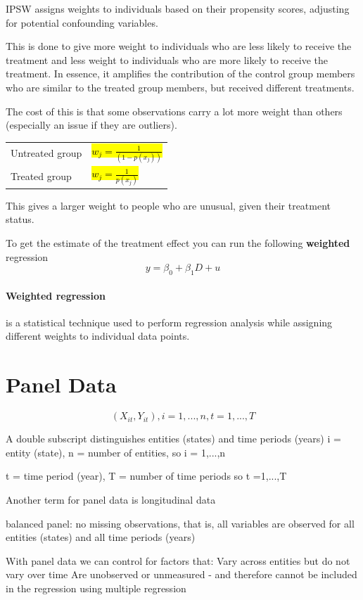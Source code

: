 \documentclass[a3paper, 8pt]{extarticle}
\begin{document}
\begin{multicols*}{5}
IPSW assigns weights to individuals based on their propensity scores, adjusting for potential confounding variables.

This is done to give more weight to individuals who are less likely to receive the treatment and less weight to individuals who are more likely to receive the treatment. In essence, it amplifies the contribution of the control group members who are similar to the treated group members, but received different treatments.

The cost of this is that some observations carry a lot more weight than others (especially an issue if they are outliers).

\begin{tabular}{l l}
    Untreated group & \hl{$w_j=\frac{1}{(1-p(x_j))}$} \\
    Treated group & \hl{$w_j=\frac{1}{p(x_j)}$}
\end{tabular}

This gives a larger weight to people who are unusual, given their treatment status.

To get the estimate of the treatment effect you can run the following \textbf{weighted} regression
$$y=\beta_0 + \beta_1 D + u$$
\paragraph{Weighted regression}
 is a statistical technique used to perform regression analysis while assigning different weights to individual data points.

\section{Panel Data}

$$(X_{it},Y_{it}), i=1, ...,n, t=1, ..., T$$

A double subscript distinguishes entities (states) and time periods (years) i = entity (state), n = number of entities,
so i = 1,...,n

t = time period (year), T = number of time periods so t =1,...,T

Another term for panel data is longitudinal data

balanced panel: no missing observations, that is, all variables are observed for all entities (states) and all time periods (years)

With panel data we can control for factors that: Vary across entities but do not vary over time
Are unobserved or unmeasured - and therefore cannot be included in the regression using multiple regression


\end{multicols*}
\end{document}
